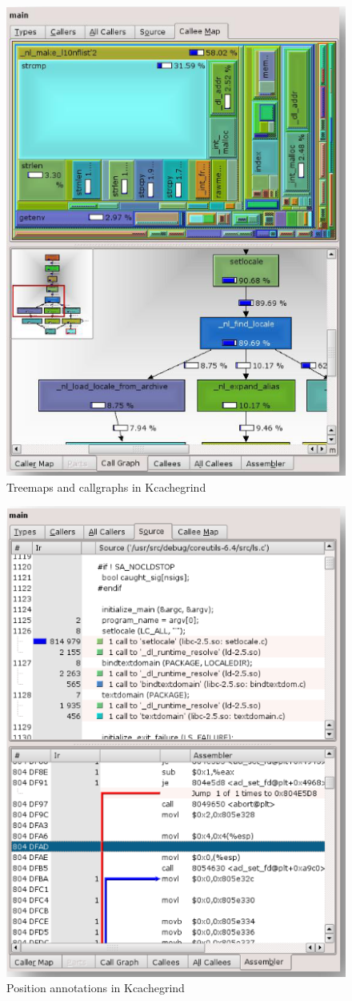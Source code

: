 \begin{figure}
    \centering
    \includegraphics[width=0.65\linewidth]{figures/kcachegrind_callgraph.png}
    \caption{Treemaps and callgraphs in Kcachegrind~\cite{kcachegrind}}
    \label{fig:kcachegrind_treemaps_and_callgraphs}
\end{figure}

\begin{figure}
    \centering
    \includegraphics[width=0.65\linewidth]{figures/kcachegrind_pos_annotation.png}
    \caption{Position annotations in Kcachegrind~\cite{kcachegrind}}
    \label{fig:kcachegrind_pos_annotations}
\end{figure}